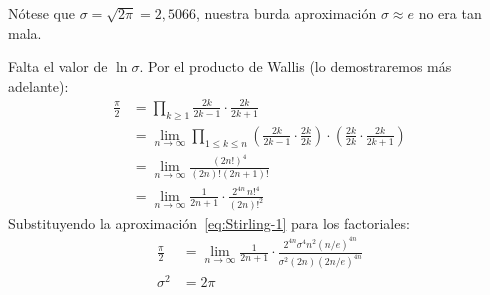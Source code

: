   Nótese que \(\sigma = \sqrt{2 \pi} = 2,5066\),
  nuestra burda aproximación \(\sigma \approx e\) no era tan mala.

  Falta el valor de \(\ln \sigma\).
  Por el producto de Wallis%
  (lo demostraremos más adelante):
  \begin{align*}
    \frac{\pi}{2}
      &= \prod_{k \ge 1}
	   \frac{2 k}{2 k - 1} \cdot \frac{2 k}{2 k + 1} \\
      &= \lim_{n \rightarrow \infty}
	   \prod_{1 \le k \le n}
	     \left(
	       \frac{2 k}{2 k - 1} \cdot \frac{2 k}{2 k}
	     \right) \cdot
	     \left(
	       \frac{2 k}{2 k} \cdot \frac{2 k}{2 k + 1}
	     \right) \\
      &= \lim_{n \rightarrow \infty}
	   \frac{(2 n!)^4}{(2 n)! (2 n + 1)!} \\
      &= \lim_{n \rightarrow \infty}
	   \frac{1}{2 n + 1} \cdot
	     \frac{2^{4 n} \, n!^4}{(2 n)!^2}
  \end{align*}
  Substituyendo la aproximación~\eqref{eq:Stirling-1}
  para los factoriales:
  \begin{align*}
    \frac{\pi}{2}
      &= \lim_{n \rightarrow \infty}
	   \frac{1}{2 n + 1} \cdot
	     \frac{2^{4 n} \sigma^4 n^2 \left( n / e \right)^{4 n}}
		  {\sigma^2 (2 n) \left( 2 n / e \right)^{4 n}} \\
    \sigma^2
      &= 2 \pi
  \end{align*}


